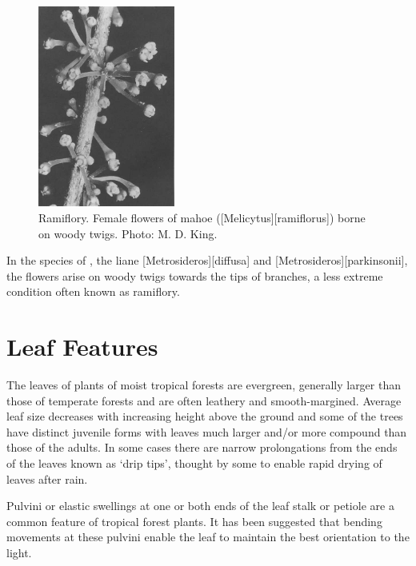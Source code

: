 \begin{figure}
	\includegraphics[width=0.4\textwidth]{graphics/figure17mahoe.jpg}
	\centering
	\caption[Ramiflory.
	Female flowers of mahoe]{Ramiflory.
	Female flowers of mahoe ([Melicytus][ramiflorus]) borne on woody twigs.
	Photo:  M. D. King.}%
	\label{fig:17mahoe}
\end{figure}

In the species of ,  the liane [Metrosideros][diffusa] and [Metrosideros][parkinsonii], the flowers arise on woody twigs towards the tips of branches, a less extreme condition often known as ramiflory.

\section{Leaf Features}

The leaves of plants of moist tropical forests are evergreen, generally larger than those of temperate forests and are often leathery and smooth-margined.
Average leaf size decreases with increasing height above the ground and some of the trees have distinct juvenile forms with leaves much larger and/or more compound than those of the adults.
In some cases there are narrow prolongations from the ends of the leaves known as `drip tips', thought by some to enable rapid drying of leaves after rain.

Pulvini or elastic swellings at one or both ends of the leaf stalk or petiole are a common feature of tropical forest plants.
It has been suggested that bending movements at these pulvini enable the leaf to maintain the best orientation to the light.

